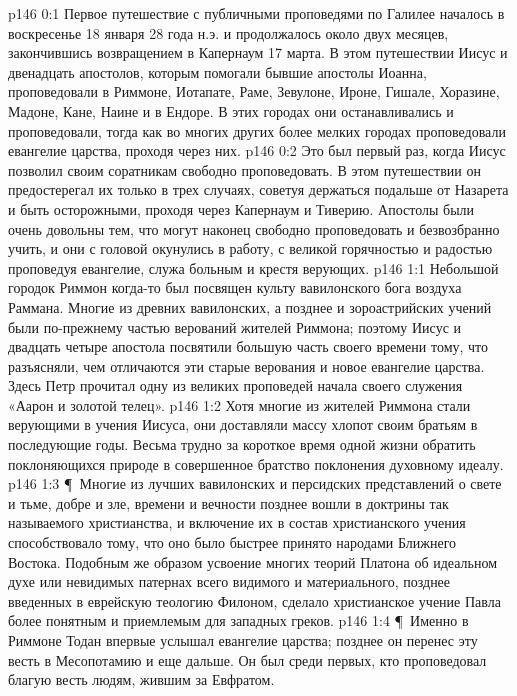 \vs p146 0:1 Первое путешествие с публичными проповедями по Галилее началось в воскресенье 18 января 28 года н.э. и продолжалось около двух месяцев, закончившись возвращением в Капернаум 17 марта. В этом путешествии Иисус и двенадцать апостолов, которым помогали бывшие апостолы Иоанна, проповедовали в Риммоне, Иотапате, Раме, Зевулоне, Ироне, Гишале, Хоразине, Мадоне, Кане, Наине и в Ендоре. В этих городах они останавливались и проповедовали, тогда как во многих других более мелких городах проповедовали евангелие царства, проходя через них.
\vs p146 0:2 Это был первый раз, когда Иисус позволил своим соратникам свободно проповедовать. В этом путешествии он предостерегал их только в трех случаях, советуя держаться подальше от Назарета и быть осторожными, проходя через Капернаум и Тиверию. Апостолы были очень довольны тем, что могут наконец свободно проповедовать и безвозбранно учить, и они с головой окунулись в работу, с великой горячностью и радостью проповедуя евангелие, служа больным и крестя верующих.
\vs p146 1:1 Небольшой городок Риммон когда\hyp{}то был посвящен культу вавилонского бога воздуха Раммана. Многие из древних вавилонских, а позднее и зороастрийских учений были по\hyp{}прежнему частью верований жителей Риммона; поэтому Иисус и двадцать четыре апостола посвятили большую часть своего времени тому, что разъясняли, чем отличаются эти старые верования и новое евангелие царства. Здесь Петр прочитал одну из великих проповедей начала своего служения «Аарон и золотой телец».
\vs p146 1:2 Хотя многие из жителей Риммона стали верующими в учения Иисуса, они доставляли массу хлопот своим братьям в последующие годы. Весьма трудно за короткое время одной жизни обратить поклоняющихся природе в совершенное братство поклонения духовному идеалу.
\vs p146 1:3 \P\ Многие из лучших вавилонских и персидских представлений о свете и тьме, добре и зле, времени и вечности позднее вошли в доктрины так называемого христианства, и включение их в состав христианского учения способствовало тому, что оно было быстрее принято народами Ближнего Востока. Подобным же образом усвоение многих теорий Платона об идеальном духе или невидимых патернах всего видимого и материального, позднее введенных в еврейскую теологию Филоном, сделало христианское учение Павла более понятным и приемлемым для западных греков.
\vs p146 1:4 \P\ Именно в Риммоне Тодан впервые услышал евангелие царства; позднее он перенес эту весть в Месопотамию и еще дальше. Он был среди первых, кто проповедовал благую весть людям, жившим за Евфратом.
